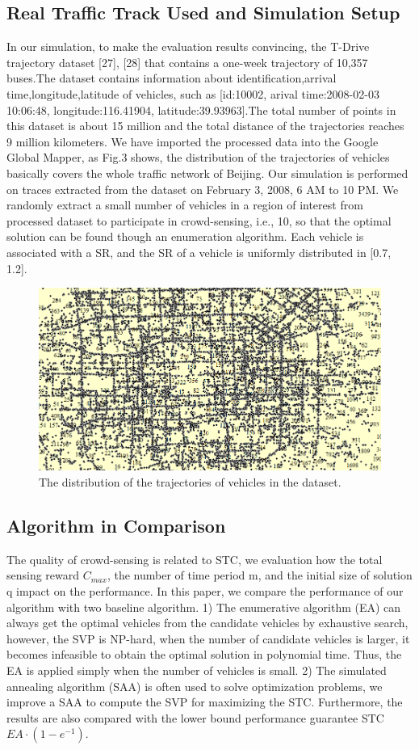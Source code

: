 \documentclass[journal]{IEEEtran}
\begin{document}
\subsection{Real Traffic Track Used and Simulation Setup}
In our simulation, to make the evaluation results convincing, the T-Drive trajectory dataset [27], [28] that contains a one-week trajectory of 10,357 buses.The dataset contains information about identification,arrival time,longitude,latitude of vehicles, such as [id:10002, arival time:2008-02-03 10:06:48, longitude:116.41904, latitude:39.93963].The total number of points in this dataset is about 15 million and the total distance of the trajectories reaches 9 million kilometers. We have imported the processed data into the Google Global Mapper, as Fig.3 shows, the distribution of the trajectories of vehicles basically covers the whole traffic network of Beijing. Our simulation is performed on traces extracted from the dataset on February 3, 2008, 6 AM to 10 PM. We randomly extract a small number of vehicles in a region of interest from processed dataset  to participate in crowd-sensing, i.e., 10, so that the optimal solution can be found though an enumeration algorithm. Each vehicle is associated with a SR, and the SR of a vehicle is uniformly distributed in [0.7, 1.2].  
\begin{figure}
	\centering
	\includegraphics[width=1\linewidth]{fig3-1.png}
	\caption{The distribution of the trajectories of vehicles in the dataset.}
	\label{fig:figure4}
\end{figure}
\subsection{Algorithm in Comparison}
The quality of crowd-sensing is related to STC, we evaluation how the total sensing reward $C_{max}$, the number of time period m, and the initial size of solution q impact on the performance. In this paper, we compare the performance of our algorithm with two baseline algorithm. 1) The enumerative algorithm (EA) can always get the optimal vehicles from the candidate vehicles by exhaustive search, however, the SVP is NP-hard, when the number of candidate vehicles is larger, it becomes infeasible to obtain the optimal solution in polynomial time. Thus, the EA is applied simply when the number of vehicles is small. 2) The simulated annealing algorithm (SAA) is often used to solve optimization problems, we improve a SAA to compute the SVP for maximizing the STC. Furthermore, the results are also compared with the lower bound performance guarantee STC $EA\cdot(1-e^{-1})$.
\end{document}

